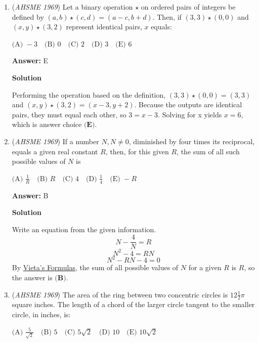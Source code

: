 \begin{enumerate}
 \textbf{Answer: }E



\textbf{Solution}

$11000_2-1_2=10111_2$. $\fbox{E}$



	\item (\textit{AHSME 1969}) Let a binary operation $\star$ on ordered pairs of integers be defined by $(a,b)\star (c,d)=(a-c,b+d)$. Then, if $(3,3)\star (0,0)$ and $(x,y)\star (3,2)$ represent identical pairs, $x$ equals:


 $\text{(A) } -3\quad \text{(B) } 0\quad \text{(C) } 2\quad \text{(D) } 3\quad \text{(E) } 6$

 \textbf{Answer: }E



\textbf{Solution}

Performing the operation based on the definition, $(3,3)\star(0,0) = (3,3)$ and $(x,y)\star(3,2)=(x-3,y+2)$.  Because the outputs are identical pairs, they must equal each other, so $3 = x-3$.  Solving for x yields $x = 6$, which is answer choice $\boxed{\textbf{(E)}}$.

 


	\item (\textit{AHSME 1969}) If a number $N,N \ne 0$, diminished by four times its reciprocal, equals a given real constant $R$, then, for this given $R$, the sum of all such possible values of $N$ is


 $\text{(A) } \frac{1}{R}\quad \text{(B) } R\quad \text{(C) } 4\quad \text{(D) } \frac{1}{4}\quad \text{(E) } -R$

 \textbf{Answer: }B



\textbf{Solution}

Write an equation from the given information.
 \[N - \frac{4}{N} = R\]
 \[N^2 - 4 = RN\]
 \[N^2 - RN - 4 = 0\]By \href{https://artofproblemsolving.com/wiki/index.php?title=Vieta\%27s\_Formulas}{Vieta's Formulas}, the sum of all possible values of $N$ for a given $R$ is $R$, so the answer is $\boxed{\textbf{(B)}}$.

 


	\item (\textit{AHSME 1969}) The area of the ring between two concentric circles is $12\frac{1}{2}\pi$ square inches. The length of a chord of the larger circle tangent to the smaller circle, in inches, is:


 $\text{(A) } \frac{5}{\sqrt{2}}\quad \text{(B) } 5\quad \text{(C) } 5\sqrt{2}\quad \text{(D) } 10\quad \text{(E) } 10\sqrt{2}$


\end{enumerate}
